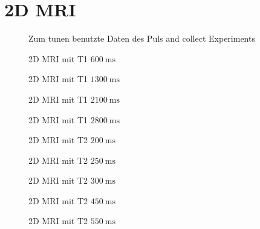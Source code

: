 \section{2D MRI}
\begin{figure}[H]
    \centering
    
    \caption{Zum tunen benutzte Daten des Puls and collect Experiments}
\end{figure}

\begin{figure}[H]
    \centering
    
    \caption{2D MRI mit T1 $\SI{600}{\milli\second}$}
\end{figure}

\begin{figure}[H]
    \centering
    
    \caption{2D MRI mit T1 $\SI{1300}{\milli\second}$}
\end{figure}
\begin{figure}[H]
    \centering
    
    \caption{2D MRI mit T1 $\SI{2100}{\milli\second}$}
\end{figure}
\begin{figure}[H]
    \centering
    
    \caption{2D MRI mit T1 $\SI{2800}{\milli\second}$}
\end{figure}

\begin{figure}[H]
    \centering
    
    \caption{2D MRI mit T2 $\SI{200}{\milli\second}$}
\end{figure}
\begin{figure}[H]
    \centering
    
    \caption{2D MRI mit T2 $\SI{250}{\milli\second}$}
\end{figure}
\begin{figure}[H]
    \centering
    
    \caption{2D MRI mit T2 $\SI{300}{\milli\second}$}
\end{figure}
\begin{figure}[H]
    \centering
    
    \caption{2D MRI mit T2 $\SI{450}{\milli\second}$}
\end{figure}
\begin{figure}[H]
    \centering
    
    \caption{2D MRI mit T2 $\SI{550}{\milli\second}$}
\end{figure}